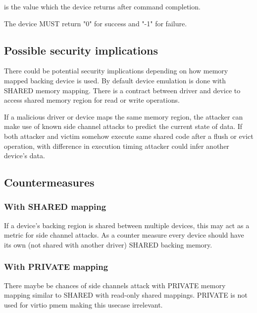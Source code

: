 is the value which the device returns after command completion.


The device MUST return "0" for success and "-1" for failure.

\subsection{Possible security implications}\label{sec:Device Types / PMEM Device / Possible Security Implications}

There could be potential security implications depending on how
memory mapped backing device is used. By default device emulation
is done with SHARED memory mapping. There is a contract between driver
and device to access shared memory region for read or write operations.

If a malicious driver or device maps the same memory region, the attacker
can make use of known side channel attacks to predict the current state of data.
If both attacker and victim somehow execute same shared code after a flush
or evict operation, with difference in execution timing attacker could infer
another device's data.

\subsection{Countermeasures}\label{sec:Device Types / PMEM Device / Possible Security Implications / Countermeasures}

\subsubsection{With SHARED mapping}\label{sec:Device Types / PMEM Device / Possible Security Implications / Countermeasures / SHARED}

If a device's backing region is shared between multiple devices, this may act
as a metric for side channel attacks. As a counter measure every device
should have its own (not shared with another driver) SHARED backing memory.

\subsubsection{With PRIVATE mapping}\label{sec:Device Types / PMEM Device / Possible Security Implications / Countermeasures / PRIVATE}
There maybe be chances of side channels attack with PRIVATE
memory mapping similar to SHARED with read-only shared mappings.
PRIVATE is not used for virtio pmem making this usecase
irrelevant.

